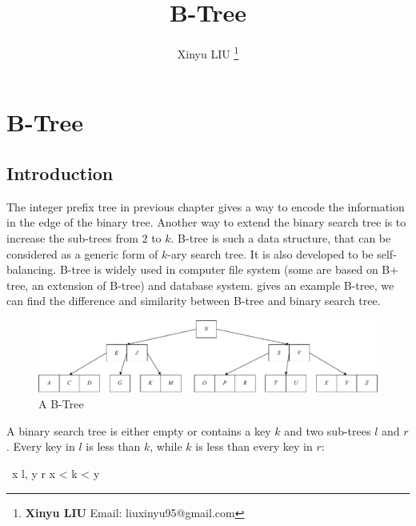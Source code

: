\documentclass[b5paper]{article}
\begin{document}
\title{B-Tree}

\author{Xinyu LIU
\thanks{{\bfseries Xinyu LIU} \newline
  Email: liuxinyu95@gmail.com \newline}
  }

\maketitle
\fi


\ifx\wholebook\relax
\chapter{B-Tree}
\fi

\section{Introduction}
\label{introduction}

The integer prefix tree in previous chapter gives a way to encode the information in the edge of the binary tree. Another way to extend the binary search tree is to increase the sub-trees from 2 to $k$. B-tree is such a data structure, that can be considered as a generic form of $k$-ary search tree. It is also developed to be self-balancing\cite{wiki-b-tree}. B-tree is widely used in computer file system (some are based on B+ tree, an extension of B-tree) and database system.  gives an example B-tree, we can find the difference and similarity between B-tree and binary search tree.

\begin{figure}[htbp]
  \centering
  \includegraphics[scale=0.5]{img/btree-del-before}
  \caption{A B-Tree}
  \label{fig:btree-example}
\end{figure}

A binary search tree is either empty or contains a key $k$ and two sub-trees $l$ and $r$. Every key in $l$ is less than $k$, while $k$ is less than every key in $r$:

\be
\forall\ x \in l, y \in r \Rightarrow x < k < y
\ee
\end{document}
